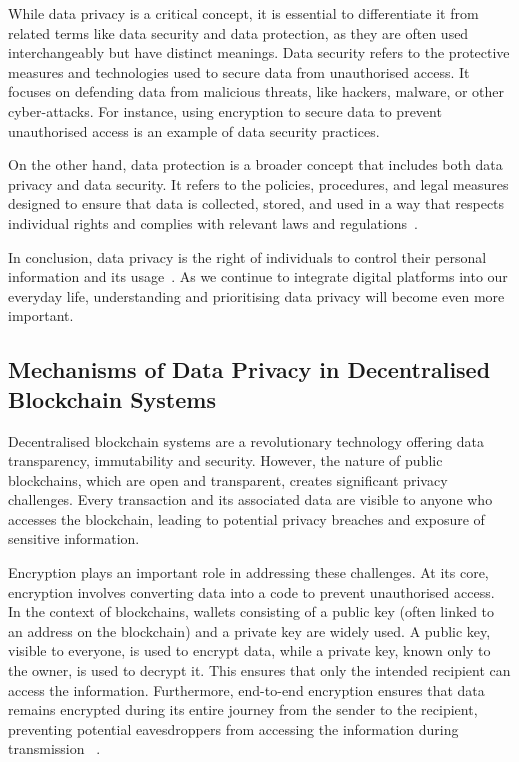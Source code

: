 While data privacy is a critical concept, it is essential to differentiate it from related terms like data security and data protection, as they are often used interchangeably but have distinct meanings.
Data security refers to the protective measures and technologies used to secure data from unauthorised access. It focuses on defending data from malicious threats, like hackers, malware, or other cyber-attacks. For instance, using encryption to secure data to prevent unauthorised access is an example of data security practices.

On the other hand, data protection is a broader concept that includes both data privacy and data security. It refers to the policies, procedures, and legal measures designed to ensure that data is collected, stored, and used in a way that respects individual rights and complies with relevant laws and regulations~\cite{Covert.2020}. 

In conclusion, data privacy is the right of individuals to control their personal information and its usage~\cite{Covert.2020}. As we continue to integrate digital platforms into our everyday life, understanding and prioritising data privacy will become even more important.

\subsection{Mechanisms of Data Privacy in Decentralised Blockchain Systems}
Decentralised blockchain systems are a revolutionary technology offering data transparency, immutability and security. However, the nature of public blockchains, which are open and transparent, creates significant privacy challenges. Every transaction and its associated data are visible to anyone who accesses the blockchain, leading to potential privacy breaches and exposure of sensitive information.

Encryption plays an important role in addressing these challenges. At its core, encryption involves converting data into a code to prevent unauthorised access. In the context of blockchains, wallets consisting of a public key (often linked to an address on the blockchain) and a private key are widely used. A public key, visible to everyone, is used to encrypt data, while a private key, known only to the owner, is used to decrypt it. This ensures that only the intended recipient can access the information. Furthermore, end-to-end encryption ensures that data remains encrypted during its entire journey from the sender to the recipient, preventing potential eavesdroppers from accessing the information during transmission ~\cite{Tran.2022b}.

